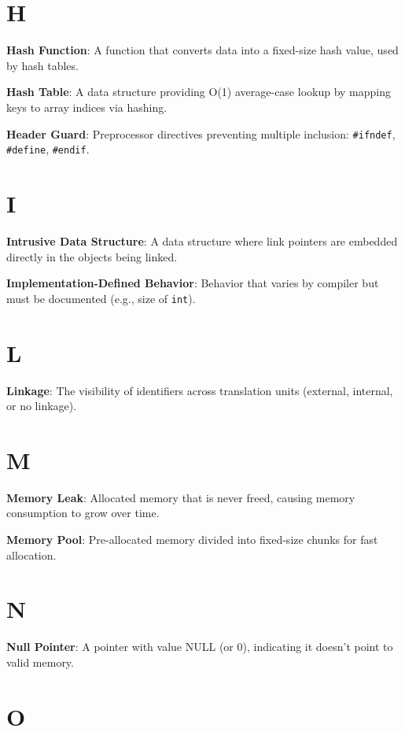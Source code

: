\documentclass[10pt,openany]{book}
\begin{document}
\section*{H}

\textbf{Hash Function}: A function that converts data into a fixed-size hash value, used by hash tables.

\textbf{Hash Table}: A data structure providing O(1) average-case lookup by mapping keys to array indices via hashing.

\textbf{Header Guard}: Preprocessor directives preventing multiple inclusion: \texttt{\#ifndef}, \texttt{\#define}, \texttt{\#endif}.

\section*{I}

\textbf{Intrusive Data Structure}: A data structure where link pointers are embedded directly in the objects being linked.

\textbf{Implementation-Defined Behavior}: Behavior that varies by compiler but must be documented (e.g., size of \texttt{int}).

\section*{L}

\textbf{Linkage}: The visibility of identifiers across translation units (external, internal, or no linkage).

\section*{M}

\textbf{Memory Leak}: Allocated memory that is never freed, causing memory consumption to grow over time.

\textbf{Memory Pool}: Pre-allocated memory divided into fixed-size chunks for fast allocation.

\section*{N}

\textbf{Null Pointer}: A pointer with value NULL (or 0), indicating it doesn't point to valid memory.

\section*{O}
\end{document}
